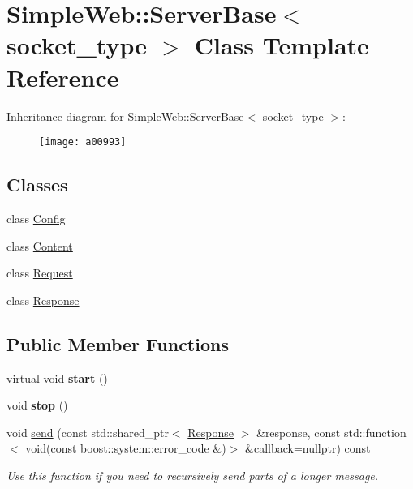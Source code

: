 \hypertarget{a00993}{}\section{Simple\+Web\+:\+:Server\+Base$<$ socket\+\_\+type $>$ Class Template Reference}
\label{a00993}
Inheritance diagram for Simple\+Web\+:\+:Server\+Base$<$ socket\+\_\+type $>$\+:\begin{figure}[H]
\begin{center}
\leavevmode
\texttt{[image: a00993]}
\end{center}
\end{figure}
\subsection*{Classes}
\begin{DoxyCompactItemize}
\item 
class \hyperlink{a01009}{Config}
\item 
class \hyperlink{a01001}{Content}
\item 
class \hyperlink{a01005}{Request}
\item 
class \hyperlink{a00997}{Response}
\end{DoxyCompactItemize}
\subsection*{Public Member Functions}
\begin{DoxyCompactItemize}
\item 
\mbox{\label{a00993_a759d6dae5fa77c47a36f7355fd33f8f7}} 
virtual void {\bfseries start} ()
\item 
\mbox{\label{a00993_a0667e44595f6c23016bee67c646ccc85}} 
void {\bfseries stop} ()
\item 
\mbox{\label{a00993_a93fd842b1a02dd63716ff0718f6069ce}} 
void \hyperlink{a00993_a93fd842b1a02dd63716ff0718f6069ce}{send} (const std\+::shared\+\_\+ptr$<$ \hyperlink{a00997}{Response} $>$ \&response, const std\+::function$<$ void(const boost\+::system\+::error\+\_\+code \&)$>$ \&callback=nullptr) const
\begin{DoxyCompactList}\small\item\em Use this function if you need to recursively send parts of a longer message. \end{DoxyCompactList}\end{DoxyCompactItemize}
